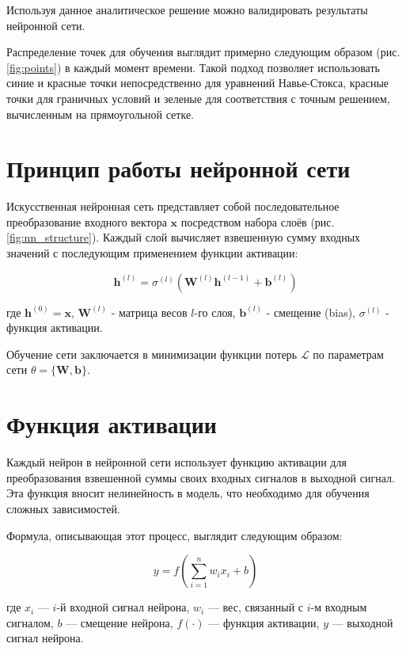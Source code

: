 

Используя данное аналитическое решение можно валидировать результаты нейронной сети.

Распределение точек для обучения выглядит примерно следующим образом
(рис. \ref{fig:points}) в каждый момент времени. Такой подход позволяет использовать
синие и красные точки непосредственно для  уравнений Навье-Стокса, красные точки для
граничных условий и зеленые для соответствия с точным решением, вычисленным на прямоугольной
сетке.


\section{Принцип работы нейронной сети}

Искусственная нейронная сеть представляет собой последовательное преобразование
входного вектора $\mathbf{x}$ посредством набора слоёв (рис. \ref{fig:nn_structure}).
Каждый слой вычисляет взвешенную сумму входных значений с последующим применением
функции активации:



$$
\mathbf{h}^{(l)} = \sigma^{(l)}\left( \mathbf{W}^{(l)} \mathbf{h}^{(l-1)} + \mathbf{b}^{(l)} \right)
$$

где $\mathbf{h}^{(0)} = \mathbf{x}$, $\mathbf{W}^{(l)}$ - матрица весов $l$-го слоя, $\mathbf{b}^{(l)}$ - смещение (bias), $\sigma^{(l)}$ - функция активации.

Обучение сети заключается в минимизации функции потерь $\mathcal{L}$ по параметрам сети $\theta = \{\mathbf{W}, \mathbf{b}\}$.


\section{Функция активации}
Каждый нейрон в нейронной сети использует функцию активации для преобразования взвешенной
суммы своих входных сигналов в выходной сигнал. Эта функция вносит нелинейность в модель,
что необходимо для обучения сложных зависимостей.

Формула, описывающая этот процесс, выглядит следующим образом:

$$y = f(\sum_{i=1}^{n} w_i x_i + b)$$

где $x_i$ — $i$-й входной сигнал нейрона, $w_i$ — вес, связанный с $i$-м входным сигналом, $b$
— смещение нейрона, $f(\cdot)$ — функция активации, $y$ — выходной сигнал нейрона.

